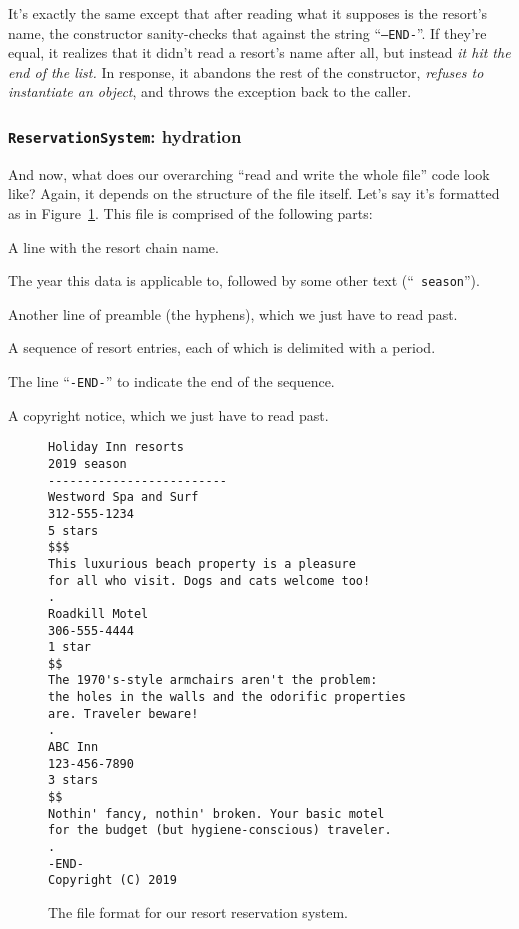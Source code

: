It's exactly the same except that after reading what it supposes is the
resort's name, the constructor sanity-checks that against the string
``\texttt{--END-}''. If they're equal, it realizes that it didn't read a
resort's name after all, but instead \textit{it hit the end of the list.} In
response, it abandons the rest of the constructor, \textit{refuses to
instantiate an object}, and throws the exception back to the caller.

\subsubsection{\texttt{ReservationSystem}: hydration}

And now, what does our overarching ``read and write the whole file'' code look
like? Again, it depends on the structure of the file itself. Let's say it's
formatted as in Figure~\ref{fig:wholeFile}. This file is comprised of the
following parts:

\begin{compactenum}
\item A line with the resort chain name.
\item The year this data is applicable to, followed by some other text
(``\texttt{ season}'').
\item Another line of preamble (the hyphens), which we just have to read
past.
\item A sequence of resort entries, each of which is delimited with a period.
\item The line ``\texttt{-END-}'' to indicate the end of the sequence.
\item A copyright notice, which we just have to read past.
\end{compactenum}


\begin{figure}[ht]
\centering
\begin{Verbatim}[fontsize=\scriptsize,samepage=true,frame=lines]
Holiday Inn resorts
2019 season
-------------------------
Westword Spa and Surf
312-555-1234
5 stars
$$$
This luxurious beach property is a pleasure
for all who visit. Dogs and cats welcome too!
.
Roadkill Motel
306-555-4444
1 star
$$
The 1970's-style armchairs aren't the problem:
the holes in the walls and the odorific properties
are. Traveler beware!
.
ABC Inn
123-456-7890
3 stars
$$  
Nothin' fancy, nothin' broken. Your basic motel 
for the budget (but hygiene-conscious) traveler.
.   
-END- 
Copyright (C) 2019
\end{Verbatim}
\caption{The file format for our resort reservation system.}
\label{fig:wholeFile}
\end{figure}

